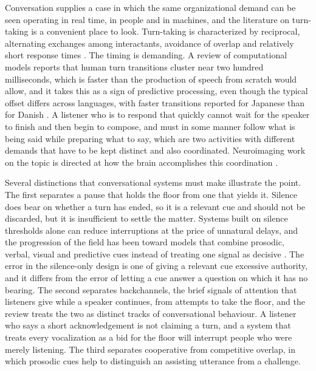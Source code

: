 \documentclass[12pt, a4paper]{article}
\begin{document}
Conversation supplies a case in which the same organizational demand can be seen operating in real time, in people and in machines, and the literature on turn-taking is a convenient place to look. Turn-taking is characterized by reciprocal, alternating exchanges among interactants, avoidance of overlap and relatively short response times \citep{cosper2025}. The timing is demanding. A review of computational models reports that human turn transitions cluster near two hundred milliseconds, which is faster than the production of speech from scratch would allow, and it takes this as a sign of predictive processing, even though the typical offset differs across languages, with faster transitions reported for Japanese than for Danish \citep{patamia2025}. A listener who is to respond that quickly cannot wait for the speaker to finish and then begin to compose, and must in some manner follow what is being said while preparing what to say, which are two activities with different demands that have to be kept distinct and also coordinated. Neuroimaging work on the topic is directed at how the brain accomplishes this coordination \citep{bogels2017}.

Several distinctions that conversational systems must make illustrate the point. The first separates a pause that holds the floor from one that yields it. Silence does bear on whether a turn has ended, so it is a relevant cue and should not be discarded, but it is insufficient to settle the matter. Systems built on silence thresholds alone can reduce interruptions at the price of unnatural delays, and the progression of the field has been toward models that combine prosodic, verbal, visual and predictive cues instead of treating one signal as decisive \citep{patamia2025}. The error in the silence-only design is one of giving a relevant cue excessive authority, and it differs from the error of letting a cue answer a question on which it has no bearing. The second separates backchannels, the brief signals of attention that listeners give while a speaker continues, from attempts to take the floor, and the review treats the two as distinct tracks of conversational behaviour. A listener who says a short acknowledgement is not claiming a turn, and a system that treats every vocalization as a bid for the floor will interrupt people who were merely listening. The third separates cooperative from competitive overlap, in which prosodic cues help to distinguish an assisting utterance from a challenge.
\end{document}
